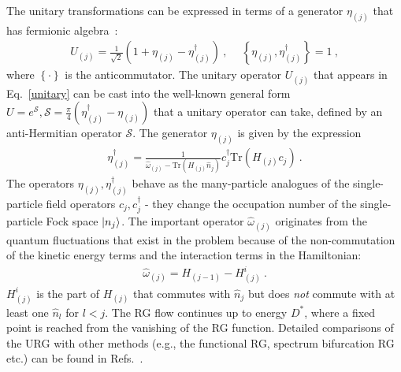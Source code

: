\documentclass[reprint,hidelinks,onecolumn]{revtex4-2}
\begin{document}
The unitary transformations can be expressed in terms of a generator \(\eta_{(j)}\) that has fermionic algebra~\cite{anirbanurg1,anirbanurg2}:
\begin{eqnarray}
	\label{unitary}
	U_{(j)} = \frac{1}{\sqrt 2}\left(1 + \eta_{(j)} - \eta_{(j)}^\dagger\right)~,~ \quad\left\{ \eta_{(j)},\eta_{(j)}^\dagger \right\} = 1~,
\end{eqnarray}
where \(\left\{\cdot\right\}\) is the anticommutator. The unitary operator \(U_{(j)}\) that appears in Eq.~\eqref{unitary} can be cast into the well-known general form \(U = e^\mathcal{S}, \mathcal{S} = \frac{\pi}{4}\left( \eta^\dagger_{(j)} - \eta_{(j)} \right)\) that a unitary operator can take, defined by an anti-Hermitian operator \(\mathcal{S}\). The generator \(\eta_{(j)}\) is given by the expression~\cite{anirbanurg1,anirbanurg2}
\begin{eqnarray}
	\eta^\dagger_{(j)} = \frac{1}{\hat \omega_{(j)} - \text{Tr}\left(H_{(j)} \hat n_{j}\right) } c^\dagger_{j} \text{Tr}\left(H_{(j)}c_{j}\right)~.
\end{eqnarray}
The operators \(\eta_{(j)},\eta^\dagger_{(j)}\) behave as the many-particle analogues of the single-particle field operators \(c_j,c^\dagger_j\) - they change the occupation number of the single-particle Fock space \(\ket{n_j}\).  The important operator \(\hat \omega_{(j)}\) originates from the quantum fluctuations that exist in the problem because of the non-commutation of the kinetic energy terms and the interaction terms in the Hamiltonian:
\begin{eqnarray}
	\hat \omega_{(j)} = H_{(j-1)} - H^i_{(j)}~.
	\label{omega}
\end{eqnarray}
\(H^i_{(j)}\) is the part of \(H_{(j)}\) that commutes with \(\hat n_j\) but does {\it not} commute with at least one \(\hat n_l\) for \(l < j\). The RG flow continues up to energy \(D^*\), where a fixed point is reached from the vanishing of the RG function. 
Detailed comparisons of the URG with other methods (e.g., the functional RG, spectrum bifurcation RG etc.) can be found in Refs.~\cite{anirbanmott1,anirbanurg1}.
\end{document}

